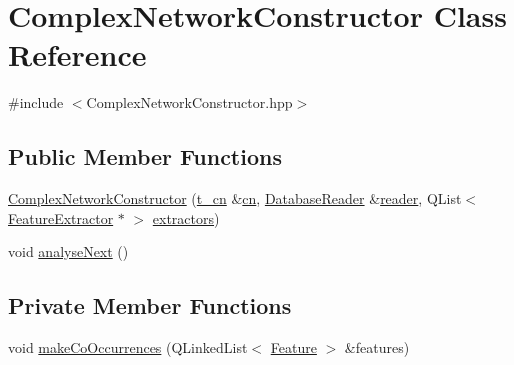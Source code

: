 \hypertarget{class_complex_network_constructor}{\section{Complex\+Network\+Constructor Class Reference}
\label{class_complex_network_constructor}
}


{\ttfamily \#include $<$Complex\+Network\+Constructor.\+hpp$>$}

\subsection*{Public Member Functions}
\begin{DoxyCompactItemize}
\item 
\hyperlink{class_complex_network_constructor_a483941f3fa2c64aea18fa2de0cca1c36}{Complex\+Network\+Constructor} (\hyperlink{_complex_network_constructor_8hpp_a4f0848d3c2144cac74d7cdb1a6a23c30}{t\+\_\+cn} \&\hyperlink{class_complex_network_constructor_afcee75ad05cd5cf6e4510096987a105b}{cn}, \hyperlink{class_database_reader}{Database\+Reader} \&\hyperlink{class_complex_network_constructor_ad223ad7e464ff159d91a89deb4e943cc}{reader}, Q\+List$<$ \hyperlink{class_feature_extractor}{Feature\+Extractor} $\ast$ $>$ \hyperlink{class_complex_network_constructor_a75c5f820c19bae3cb46671aa89ef348f}{extractors})
\item 
void \hyperlink{class_complex_network_constructor_abab51d7158c40ee03e6d1fa1bf09af3f}{analyse\+Next} ()
\end{DoxyCompactItemize}
\subsection*{Private Member Functions}
\begin{DoxyCompactItemize}
\item 
void \hyperlink{class_complex_network_constructor_ab240a904e7da7bbd5bfd776b5b9176df}{make\+Co\+Occurrences} (Q\+Linked\+List$<$ \hyperlink{class_feature}{Feature} $>$ \&features)
\end{DoxyCompactItemize}
